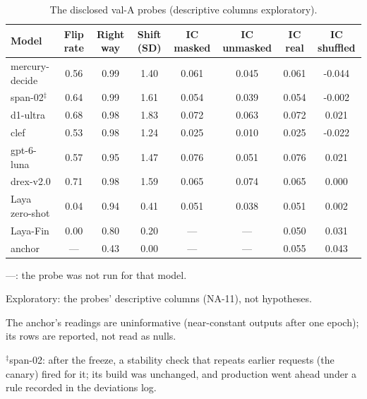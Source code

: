 \begin{table}[htbp]
\centering
\footnotesize
\setlength{\tabcolsep}{4pt}
\begin{threeparttable}
\caption{The disclosed val-A probes (descriptive columns exploratory).}\label{tab:a-probes-val-a}
\begin{tabular}{@{}lS[table-format=1.2]S[table-format=1.2]S[table-format=1.2]S[table-format=1.3]S[table-format=1.3]S[table-format=1.3]S[table-format=-1.3]@{}}
\toprule
Model & {Flip rate} & {Right way} & {Shift (SD)} & {IC masked} & {IC unmasked} & {IC real} & {IC shuffled} \\
\midrule
mercury-decide & 0.56 & 0.99 & 1.40 & 0.061 & 0.045 & 0.061 & -0.044 \\
span-02$^{\ddagger}$ & 0.64 & 0.99 & 1.61 & 0.054 & 0.039 & 0.054 & -0.002 \\
d1-ultra & 0.68 & 0.98 & 1.83 & 0.072 & 0.063 & 0.072 & 0.021 \\
clef & 0.53 & 0.98 & 1.24 & 0.025 & 0.010 & 0.025 & -0.022 \\
gpt-6-luna & 0.57 & 0.95 & 1.47 & 0.076 & 0.051 & 0.076 & 0.021 \\
drex-v2.0 & 0.71 & 0.98 & 1.59 & 0.065 & 0.074 & 0.065 & 0.000 \\
Laya zero-shot & 0.04 & 0.94 & 0.41 & 0.051 & 0.038 & 0.051 & 0.002 \\
Laya-Fin & 0.00 & 0.80 & 0.20 & {---} & {---} & 0.050 & 0.031 \\
anchor & {---} & 0.43 & 0.00 & {---} & {---} & 0.055 & 0.043 \\
\bottomrule
\end{tabular}
\begin{tablenotes}[flushleft]\footnotesize
\item ---: the probe was not run for that model.
\item Exploratory: the probes' descriptive columns (NA-11), not hypotheses.
\item The anchor's readings are uninformative (near-constant outputs after one epoch); its rows are reported, not read as nulls.
\item $^{\ddagger}$span-02: after the freeze, a stability check that repeats earlier requests (the canary) fired for it; its build was unchanged, and production went ahead under a rule recorded in the deviations log.
\end{tablenotes}
\end{threeparttable}
\end{table}
